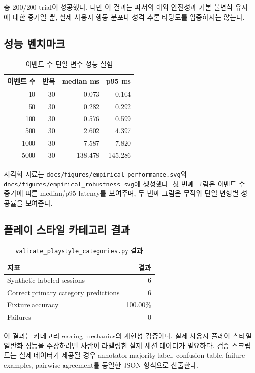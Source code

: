 \documentclass[11pt,a4paper]{article}
\begin{document}
총 200/200 trial이 성공했다. 다만 이 결과는 파서의 예외 안전성과 기본 불변식 유지에 대한
증거일 뿐, 실제 사용자 행동 분포나 성격 추론 타당도를 입증하지는 않는다.

\subsection{성능 벤치마크}
\begin{table}[h]
\centering
\begin{tabular}{rrrr}
\toprule
이벤트 수 & 반복 & median ms & p95 ms \\
\midrule
10 & 30 & 0.073 & 0.104 \\
50 & 30 & 0.282 & 0.292 \\
100 & 30 & 0.576 & 0.599 \\
500 & 30 & 2.602 & 4.397 \\
1000 & 30 & 7.587 & 7.820 \\
5000 & 30 & 138.478 & 145.286 \\
\bottomrule
\end{tabular}
\caption{이벤트 수 단일 변수 성능 실험}
\end{table}

시각화 자료는 \texttt{docs/figures/empirical\_performance.svg}와
\texttt{docs/figures/empirical\_robustness.svg}에 생성했다. 첫 번째 그림은 이벤트 수 증가에
따른 median/p95 latency를 보여주며, 두 번째 그림은 무작위 단일 변형별 성공률을 보여준다.

\subsection{플레이 스타일 카테고리 결과}
\begin{table}[h]
\centering
\begin{tabular}{lr}
\toprule
지표 & 결과 \\
\midrule
Synthetic labeled sessions & 6 \\
Correct primary category predictions & 6 \\
Fixture accuracy & 100.00\% \\
Failures & 0 \\
\bottomrule
\end{tabular}
\caption{\texttt{validate\_playstyle\_categories.py} 결과}
\end{table}

이 결과는 카테고리 scoring mechanics의 재현성 검증이다. 실제 사용자 플레이 스타일 일반화
성능을 주장하려면 사람이 라벨링한 실제 세션 데이터가 필요하다. 검증 스크립트는 실제 데이터가
제공될 경우 annotator majority label, confusion table, failure examples, pairwise agreement를
동일한 JSON 형식으로 산출한다.
\end{document}
